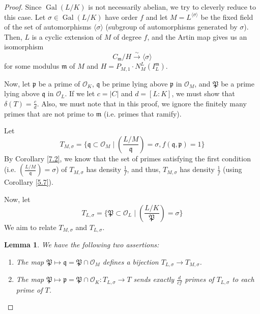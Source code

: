 \documentclass{article}
\DeclareMathOperator{\Gal}{Gal}
\theoremstyle{plain}
\newtheorem{lemma}[thm]{Lemma}
\theoremstyle{definition}
\theoremstyle{remark}
\numberwithin{equation}{section}
\numberwithin{thm}{section}
\begin{document}
\begin{proof}
Since $\Gal(L/K)$ is not necessarily abelian, we try to cleverly reduce to this case. Let $\sigma \in \Gal(L/K)$ have order $f$ and let $M = L^{\langle\sigma\rangle}$ be the fixed field of the set of automorphisms $\langle\sigma\rangle$ (subgroup of automorphisms generated by $\sigma$). Then, $L$ is a cyclic extension of $M$ of degree $f$, and the Artin map gives us an isomorphism $$C_{\mathfrak{m}}/H \xrightarrow{\sim} \langle\sigma\rangle$$ for some modulus $\mathfrak{m}$ of $M$ and $H = P_{M, 1} \cdot N_{M}^{L}(I_{L}^{\mathfrak{m}})$. 

Now, let $\mathfrak{p}$ be a prime of $\mathcal{O}_K$, $\mathfrak{q}$ be prime lying above $\mathfrak{p}$ in $\mathcal{O}_M$, and $\mathfrak{P}$ be a prime lying above $\mathfrak{q}$ in $\mathcal{O}_L$. If we let $c = |C|$ and $d = [L : K]$, we must show that $\delta(T) = \frac{c}{d}$. Also, we must note that in this proof, we ignore the finitely many primes that are not prime to $\mathfrak{m}$ (i.e. primes that ramify). 

Let $$T_{M, \sigma} = \{\mathfrak{q} \subset \mathcal{O}_M \mid \left(\frac{L/M}{\mathfrak{q}}\right) = \sigma, f(\mathfrak{q}, \mathfrak{p}) = 1\}$$ By Corollary \ref{7.2}, we know that the set of primes satisfying the first condition (i.e. $\left(\frac{L/M}{\mathfrak{q}}\right) = \sigma$) of $T_{M, \sigma}$ has density $\frac{1}{f}$, and thus, $T_{M, \sigma}$ has density $\frac{1}{f}$ (using Corollary \ref{5.7}). 

Now, let $$T_{L, \sigma} = \{\mathfrak{P} \subset \mathcal{O}_L \mid \left(\frac{L/K}{\mathfrak{P}}\right) = \sigma\}$$ We aim to relate $T_{M, \sigma}$ and $T_{L, \sigma}$.

\begin{lemma}
We have the following two assertions:

\begin{enumerate}

    \item The map $\mathfrak{P} \mapsto \mathfrak{q} = \mathfrak{P} \cap \mathcal{O}_M$ defines a bijection $T_{L, \sigma} \to T_{M, \sigma}$. 
    
    \item The map $\mathfrak{P} \mapsto \mathfrak{p} = \mathfrak{P} \cap \mathcal{O}_K : T_{L, \sigma} \to T$ sends exactly $\frac{d}{cf}$ primes of $T_{L, \sigma}$ to each prime of $T$. 

\end{enumerate}


\end{lemma}
\end{proof}
\end{document}
